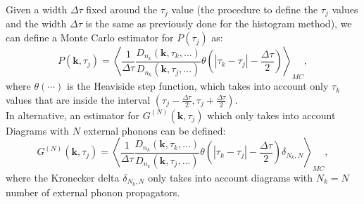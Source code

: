Given a width $\Delta\tau$ fixed around the $\tau_j$ value (the procedure to define the $\tau_j$ values and the width $\Delta\tau$ is the 
same as previously done for the histogram method), we can define a Monte Carlo estimator for $P(\tau_j)$ as:
\begin{equation}
    P(\mathbf{k},\tau_j)=\left\langle  \frac{1}{\Delta\tau}\frac{D_{n_k}(\mathbf{k},\tau_k,...)}{D_{n_k}(\mathbf{k},\tau_j,...)} \theta\left(\left|\tau_k-\tau_j\right|-\frac{\Delta\tau}{2}\right)\right\rangle_{MC},
\end{equation}
where $\theta(\cdots)$ is the Heaviside step function, which takes into account only $\tau_k$ values that are inside the interval $(\tau_j-\frac{\Delta\tau}{2},\tau_j+\frac{\Delta\tau}{2})$.\\
In alternative, an estimator for $G^{(N)}(\mathbf{k},\tau_j)$ which only takes into account Diagrams with $N$ external phonons can be defined:
\begin{equation}
    G^{(N)}(\mathbf{k},\tau_j)=\left\langle  \frac{1}{\Delta\tau}\frac{D_{n_k}(\mathbf{k},\tau_k,...)}{D_{n_k}(\mathbf{k},\tau_j,...)} \theta\left(\left|\tau_k-\tau_j\right|-\frac{\Delta\tau}{2}\right)\delta_{N_k,N}\right\rangle_{MC},
\end{equation}
where the Kronecker delta $\delta_{N_k,N}$ only takes into account diagrams with $N_k=N$ number of external phonon propagators.